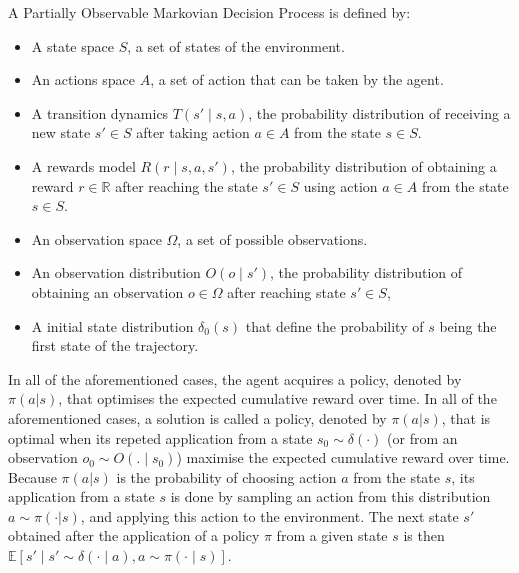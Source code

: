 \begin{definition}[POMDP]
    A Partially Observable Markovian Decision Process is defined by:
    \begin{itemize}
        \item A state space $S$, a set of states of the environment.
        \item An actions space $A$, a set of action that can be taken by the agent.
        \item A transition dynamics $T(s' \mid s,a)$, the probability distribution of receiving a new state $s' \in S$ after
    taking action $a \in A$ from the state $s \in S$.
        \item A rewards model $R(r \mid s, a, s')$, the probability distribution of obtaining a reward $r\in \mathbb{R}$ after
    reaching the state $s' \in S$ using action $a \in A$ from the state $s \in S$.
        \item An observation space $\Omega$, a set of possible observations.
        \item An observation distribution $O(o \mid s')$, the probability distribution of obtaining an observation $o \in \Omega$
    after reaching state $s' \in S$,
        \item A initial state distribution $\delta_0(s)$ that define the probability of $s$ being the first state of the
        trajectory. %
    \end{itemize}
\end{definition}

In all of the aforementioned cases, the agent acquires a policy, denoted by $\pi(a|s)$, that optimises the expected
cumulative reward over time.
In all of the aforementioned cases, a solution is called a policy, denoted by $\pi(a|s)$, that is optimal when its repeted application from a state 
$s_0 \sim \delta(\cdot)$ (or from an observation $o_0 \sim O(. \mid s_0)$) maximise the expected cumulative reward over time.
Because $\pi(a|s)$ is the probability of choosing action $a$ from the state $s$, its application from a state $s$ is done by sampling an action from this 
distribution $a \sim \pi(\cdot |s)$, and applying this action to the environment. 
The next state $s'$ obtained after the application of a policy $\pi$ from a given state $s$ is then 
$\mathbb{E} \left[ s' \mid s' \sim \delta(\cdot \mid a), a \sim \pi(\cdot \mid s)\right]$.

